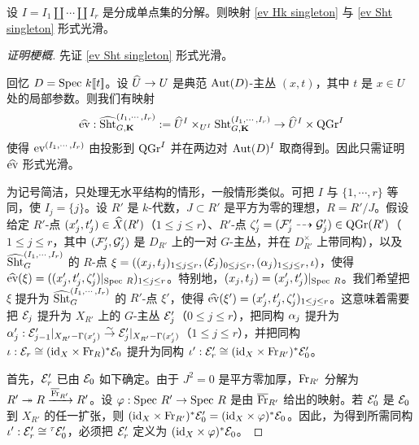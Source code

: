 \begin{prop}\label{p:fm sm} 设 $I=I_{1}\coprod\cdots\coprod I_{r}$ 是分成单点集的分解。则映射 \eqref{ev Hk singleton} 与 \eqref{ev Sht singleton} 形式光滑。
\end{prop}
\begin{proof}[证明梗概]

先证 \eqref{ev Sht singleton} 形式光滑。

回忆 $D=\textup{Spec}\  k[\![t]\!]$。设 $\widehat{U}\to U$ 是典范 $\textup{Aut}(D)$-主丛 $(x,t)$，其中 $t$ 是 $x\in U$ 处的局部参数。则我们有映射
\begin{equation*}
\widehat{\textup{ev}}: \widehat{\textup{Sht}}^{(I_{1},\cdots, I_{r})}_{G,\mathbf{K}}:=\widehat{U}^{I}\times_{U^{I}}\textup{Sht}^{(I_{1},\cdots, I_{r})}_{G,\mathbf{K}}\to  \widehat{U}^{I}\times \mathrm{QGr}^{I}
\end{equation*}
使得 $\textup{ev}^{(I_{1},\cdots, I_{r})}$ 由投影到 $\mathrm{QGr}^{I}$ 并在两边对 $\textup{Aut}(D)^{I}$ 取商得到。因此只需证明 $\widehat{\textup{ev}}$ 形式光滑。

为记号简洁，只处理无水平结构的情形，一般情形类似。可把 $I$ 与 $\{1,\cdots, r\}$ 等同，使 $I_{j}=\{j\}$。设 $R'$ 是 $k$-代数，$J\subset R'$ 是平方为零的理想，$R=R'/J$。假设给定 $R'$-点 $(x'_{j}, t'_{j})\in \widehat{X}(R')$（$1\le j\le r$）、$R'$-点 $\zeta'_{j}=(\mathcal{F}'_{j}\dashrightarrow{} \mathcal{G}'_{j})\in \mathrm{QGr}(R')$（$1\le j\le r$，其中 $(\mathcal{F}'_{j}, \mathcal{G}'_{j})$ 是 $D_{R'}$ 上的一对 $G$-主丛，并在 $D^{\times}_{R'}$ 上带同构），以及 $\widehat{\textup{Sht}}^{(I_{1},\cdots, I_{r})}_{G}$ 的 $R$-点 $\xi=((x_{j},t_{j})_{1\le j\le r}, (\mathcal{E}_{j})_{0\le j\le r}, (\alpha_{j})_{1\le j\le r}, \iota)$，使得 $\widehat{\textup{ev}}(\xi)=((x'_{j}, t'_{j},\zeta'_{j})|_{\textup{Spec}\  R})_{1\le j\le r}$。特别地，$(x_{j},t_{j})=(x'_{j}, t'_{j})|_{\textup{Spec}\  R}$。我们希望把 $\xi$ 提升为 $\widehat{\textup{Sht}}^{(I_{1},\cdots, I_{r})}_{G}$ 的 $R'$-点 $\xi'$，使得 $\widehat{\textup{ev}}(\xi')=(x'_{j}, t'_{j}, \zeta'_{j})_{1\le j\le r}$。这意味着需要把 $\mathcal{E}_{j}$ 提升为 $X_{R'}$ 上的 $G$-主丛 $\mathcal{E}'_{j}$（$0\le j\le r$），把同构 $\alpha_{j}$ 提升为 $\alpha'_{j}: \mathcal{E}'_{j-1}|_{X_{R'}-\Gamma(x'_{j})}\stackrel{\sim}{\to} \mathcal{E}'_{j}|_{X_{R'}-\Gamma(x'_{j})}$（$1\le j\le r$），并把同构 $\iota: \mathcal{E}_{r}\cong(\textup{id}_{X}\times \textup{Fr}_{R})^{*}\mathcal{E}_{0}$ 提升为同构 $\iota': \mathcal{E}'_{r}\cong(\textup{id}_{X}\times \textup{Fr}_{R'})^{*}\mathcal{E}'_{0}$。

首先，$\mathcal{E}'_{r}$ 已由 $\mathcal{E}_{0}$ 如下确定。由于 $J^{2}=0$ 是平方零加厚，$\textup{Fr}_{R'}$ 分解为 $R'\twoheadrightarrow R\xrightarrow{\overline{\textup{Fr}}_{R'}} R'$。设 $\varphi: \textup{Spec}\  R'\to \textup{Spec}\  R$ 是由 $\overline{\textup{Fr}}_{R'}$ 给出的映射。若 $\mathcal{E}'_{0}$ 是 $\mathcal{E}_{0}$ 到 $X_{R'}$ 的任一扩张，则 $(\textup{id}_{X}\times \textup{Fr}_{R'})^{*}\mathcal{E}'_{0}=(\textup{id}_{X}\times \varphi)^{*}\mathcal{E}_{0}$。因此，为得到所需同构 $\iota': \mathcal{E}'_{r}\cong {}^{\tau}\mathcal{E}'_{0}$，必须把 $\mathcal{E}'_{r}$ 定义为 $(\textup{id}_{X}\times \varphi)^{*}\mathcal{E}_{0}$。


\end{proof}
